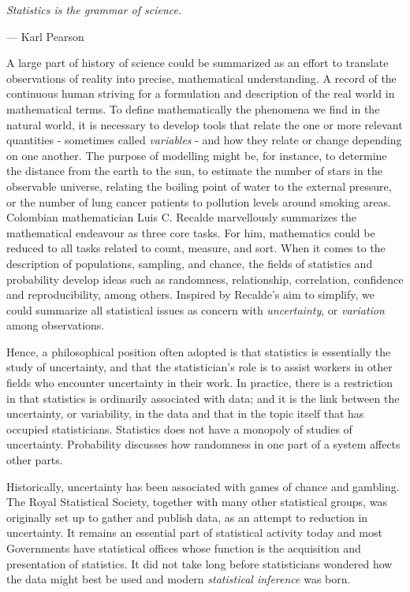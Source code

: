 \documentclass{book}
\begin{document}
\epigraph{\textit{Statistics is the grammar of science.}}{— Karl Pearson}
 
 A large part of history of science could be summarized as an effort to translate observations of reality into precise, mathematical understanding. A record of the continuous human striving for a formulation and description of the real world in mathematical terms. To define mathematically the phenomena we find in the natural world, it is necessary to develop tools that relate the one or more relevant quantities - sometimes called \textit{variables} - and how they relate or change depending on one another. The purpose of modelling might be, for instance, to determine the distance from the earth to the sun, to estimate the number of stars in the observable universe, relating the boiling point of water to the external pressure, or the number of lung cancer patients to pollution levels around smoking areas.\\
 
Colombian mathematician Luis C. Recalde marvellously summarizes the mathematical endeavour as three core tasks. For him, mathematics could be reduced to all tasks related to count, measure, and sort. When it comes to the description of populations, sampling, and chance, the fields of statistics and probability develop ideas such as randomness, relationship, correlation, confidence and reproducibility, among others. Inspired by Recalde's aim to simplify, we could summarize all statistical issues as concern with \textit{uncertainty}, or \textit{variation} among observations.

Hence, a philosophical position often adopted is that statistics is essentially the study of uncertainty, and that the statistician's role is to assist workers in other fields who encounter uncertainty in their work. In practice, there is a restriction in that statistics is ordinarily associated with data; and it is the link between the uncertainty, or variability, in the data and that in the topic itself that has occupied statisticians. Statistics does not have a monopoly of studies of uncertainty. Probability discusses how randomness in one part of a system affects other parts.

\medskip

Historically, uncertainty has been associated with games of chance and gambling. The Royal Statistical Society, together with many other statistical groups, was originally set up
to gather and publish data, as an attempt to reduction in uncertainty. It remains an essential part of statistical activity today and most Governments have statistical offices whose function is the acquisition and presentation of statistics. It did not take long before statisticians wondered how the data might best be used and modern \textit{statistical inference} was born.
\end{document}
